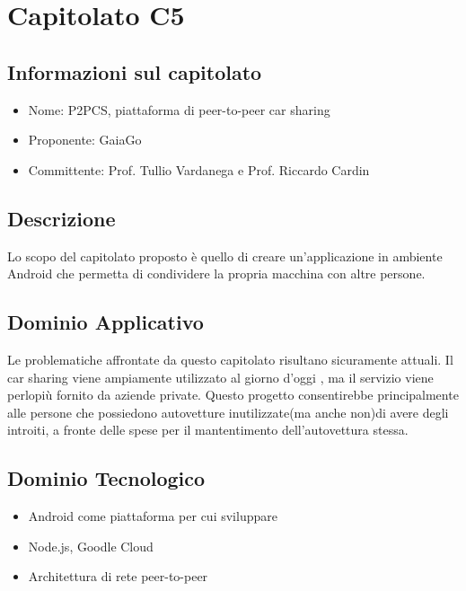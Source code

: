 %


\section{Capitolato C5}
\subsection{Informazioni sul capitolato}

\begin{itemize}
    \item Nome: P2PCS, piattaforma di peer-to-peer car sharing
	\item Proponente: GaiaGo
	\item Committente: Prof. Tullio Vardanega e Prof. Riccardo Cardin
\end{itemize}

\subsection{Descrizione}
Lo scopo del capitolato proposto è quello di creare un'applicazione in ambiente Android che permetta di condividere la propria macchina con altre persone.

\subsection{Dominio Applicativo}
Le problematiche affrontate da questo capitolato risultano sicuramente attuali. Il car sharing viene ampiamente utilizzato al giorno d'oggi , ma il servizio viene perlopiù fornito da aziende private. Questo progetto consentirebbe principalmente alle persone che possiedono autovetture inutilizzate(ma anche non)di avere degli introiti, a fronte delle spese per il mantentimento dell'autovettura stessa.
\subsection{Dominio Tecnologico}
\begin{itemize}
    \item Android come piattaforma per cui sviluppare
    \item Node.js, Goodle Cloud
    \item Architettura di rete peer-to-peer
\end{itemize}

